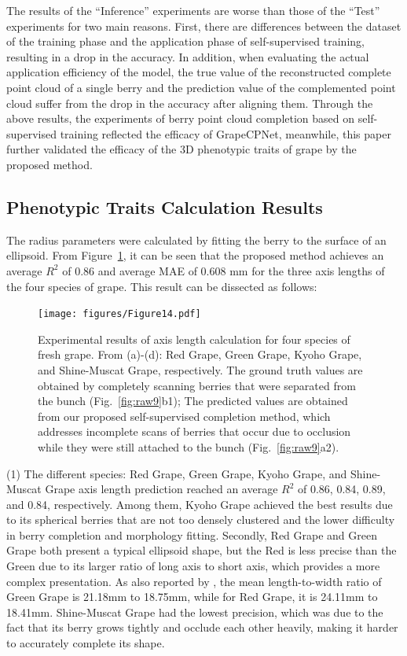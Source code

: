 \documentclass[12pt]{article}
\begin{document}
The results of the ``Inference'' experiments are worse than those of the ``Test'' experiments for two main reasons.
First, there are differences between the dataset of the training phase and the application phase of self-supervised training, resulting in a drop in the accuracy. 
In addition, when evaluating the actual application efficiency of the model, the true value of the reconstructed complete point cloud of a single berry and the prediction value of the complemented point cloud suffer from the drop in the accuracy after aligning them. 
Through the above results, the experiments of berry point cloud completion based on self-supervised training reflected the efficacy of GrapeCPNet, meanwhile, this paper further validated the efficacy of the 3D phenotypic traits of grape by the proposed method.

\subsection{Phenotypic Traits Calculation Results}

The radius parameters were calculated by fitting the berry to the surface of an ellipsoid.
From Figure~\ref{fig:raw17}, it can be seen that the proposed method achieves an average $R^2$ of 0.86 and average MAE of 0.608 mm for the three axis lengths of the four species of grape. 
This result can be dissected as follows:

\begin{figure}[hbt!]
    \centering
    \texttt{[image: figures/Figure14.pdf]}
    \caption{Experimental results of axis length calculation for four species of fresh grape. From (a)-(d): Red Grape, Green Grape, Kyoho Grape, and Shine-Muscat Grape, respectively. The ground truth values are obtained by completely scanning berries that were separated from the bunch (Fig.~\ref{fig:raw9}b1); The predicted values are obtained from our proposed self-supervised completion method, which addresses incomplete scans of berries that occur due to occlusion while they were still attached to the bunch (Fig.~\ref{fig:raw9}a2).}
    \label{fig:raw17}
\end{figure}

(1) The different species: Red Grape, Green Grape, Kyoho Grape, and Shine-Muscat Grape axis length prediction reached an average $R^2$ of 0.86, 0.84, 0.89, and 0.84, respectively. 
Among them, Kyoho Grape achieved the best results due to its spherical berries that are not too densely clustered and the lower difficulty in berry completion and morphology fitting. 
Secondly, Red Grape and Green Grape both present a typical ellipsoid shape, but the Red is less precise than the Green due to its larger ratio of long axis to short axis, which provides a more complex presentation. 
As also reported by \citet{schneider_predicting_2020}, the mean length-to-width ratio of Green Grape is 21.18mm to 18.75mm, while for Red Grape, it is 24.11mm to 18.41mm.
Shine-Muscat Grape had the lowest precision, which was due to the fact that its berry grows tightly and occlude each other heavily, making it harder to accurately complete its shape.
\end{document}
